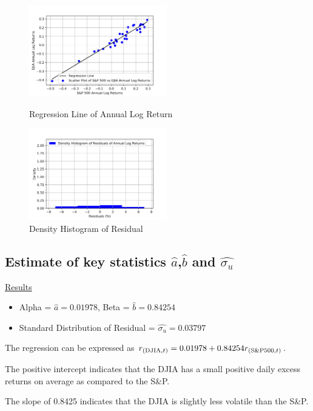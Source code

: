 \documentclass[a4paper]{article}
\begin{document}
	\begin{figure}[htbp]
		\centering
		\begin{minipage}[t]{0.48\textwidth}
			\centering
			\includegraphics[width=6cm]{Ann_Scatter.png}
			\captionsetup{font=small}
			\caption{Regression Line of Annual Log Return}
		\end{minipage}
		\begin{minipage}[t]{0.48\textwidth}
			\centering
			\includegraphics[width=6cm]{Ann_Hist.png}
			\captionsetup{font=small}
			\caption{Density Histogram of Residual}
		\end{minipage}
	\end{figure}
	
	\subsection{Estimate of key statistics $\hat{a}$,$\hat{b}$ and $\hat{\sigma_u}$}
	\underline{Results}
	\begin{itemize}[nosep]
		\item Alpha = $\hat{a} = 0.01978$, Beta = $\hat{b} = 0.84254$
		\item Standard Distribution of Residual = $\hat{\sigma_{u}} = 0.03797$
	\end{itemize}

    The regression can be expressed as $r_{(\textnormal{DJIA}, t)} = 0.01978 +  0.84254 r_{(\textnormal{S\&P500}, t)}$.
	
	The positive intercept indicates that the DJIA has a small positive daily excess returns on average as compared to the S\&P. 
	
	The slope of 0.8425 indicates that the DJIA is slightly less volatile than the S\&P. 
	
\end{document}
